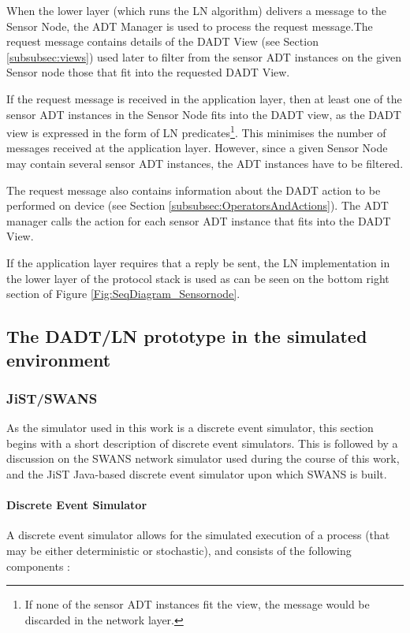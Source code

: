 When the lower layer (which runs the LN algorithm) delivers a message to the
Sensor Node, the ADT Manager is used to process the request message.The
request message contains details of the DADT View (see Section
\ref{subsubsec:views}) used later to filter from the sensor ADT
instances on the given Sensor node those that fit into the requested DADT View. 

If the request message is received in the application layer, then at least one of
the sensor ADT instances in the Sensor Node fits into the DADT view, as the DADT
view is expressed in the form of LN predicates\footnote{If none of the sensor ADT instances fit the view, the message would be discarded in the network layer.}. This minimises the number of
messages received at the application layer. However, since a given Sensor Node
may contain several sensor ADT instances, the ADT instances have to be filtered.

The request message also contains information about the DADT action to be
performed on device (see Section \ref{subsubsec:OperatorsAndActions}). 
The ADT manager calls the action for each sensor ADT instance that fits into the DADT View. 

If the application layer requires that a reply be sent, the LN implementation in
the lower layer of the protocol stack is used as can be seen on the bottom
right section of Figure \ref{Fig:SeqDiagram_Sensornode}.


\subsection{The DADT/LN prototype in the simulated environment}
\subsubsection {JiST/SWANS} \label{sec:jistswans}

As the simulator used in this work is a discrete event simulator, this section 
begins with a short description of discrete event simulators. 
This is followed by a discussion on the SWANS network simulator used during the course of this work, and the JiST Java-based discrete event simulator upon which SWANS is built.

\paragraph{Discrete Event Simulator}

A discrete event simulator allows for the simulated execution of a process (that
may be either deterministic or stochastic), and consists of the following
components \cite{Shankar_DiscreteEventSim}:

